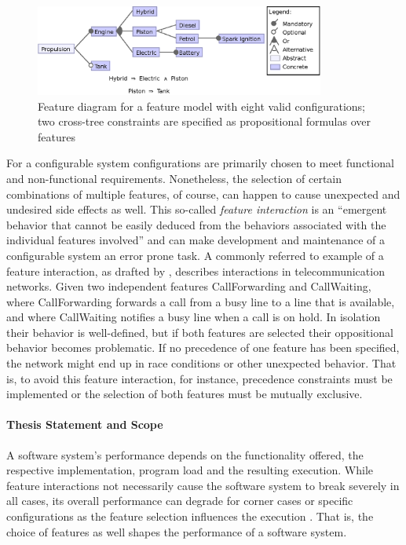 \begin{figure}[htbp]
  \centering
  
  	\includegraphics[width=0.85\textwidth]{images/introduction_fm.eps}
  \caption{Feature diagram for a feature model with eight valid configurations;
  two cross-tree constraints are specified as propositional formulas over
  features}
  \label{fig:introduction_fm}
\end{figure}

For a configurable system configurations are primarily chosen to meet
functional and non-functional requirements. Nonetheless, the selection of
certain combinations of multiple features, of course, can happen to cause
unexpected and undesired side effects as well. This so-called \emph{feature
interaction} is an ``emergent behavior that cannot be easily deduced from the
behaviors associated with the individual features involved''
\citep{apel_feature-oriented_2013} and can make development and
maintenance of a configurable system an error prone task. 
A commonly referred to example of a feature interaction, as drafted by
\cite{calder_feature_2003}, describes interactions in telecommunication networks. Given two
independent features \textsf{CallForwarding} and \textsf{CallWaiting}, where \textsf{CallForwarding} forwards a call from a busy line to a line that is
available, and where \textsf{CallWaiting} notifies a busy line when a call is on
hold. In isolation their behavior is well-defined, but if both features are selected their oppositional
behavior becomes problematic. If no precedence of one feature has been
specified, the network might end up in race conditions or other unexpected
behavior. That is, to avoid this feature interaction, for instance, precedence
constraints must be implemented or the selection of both features must be
mutually exclusive.


\paragraph*{Thesis Statement and Scope}
A software system’s performance depends on the functionality offered, the
respective implementation, program load and the resulting execution. While
feature interactions not necessarily cause the software system to break
severely in all cases, its overall performance can degrade for corner cases or
specific configurations as the feature selection influences the execution
\citep{foo_mining_2010,heger_automated_2013,nguyen_industrial_2014}.
That is, the choice of features as well shapes the performance of a software system.

